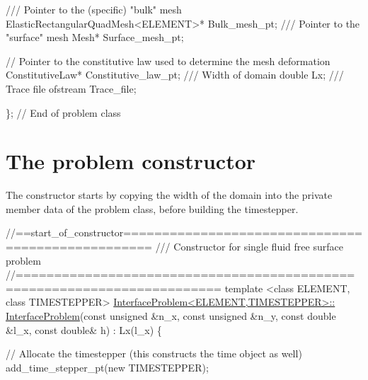 \begin{DoxyCodeInclude}
 \textcolor{comment}{/// Pointer to the (specific) "bulk" mesh}
 ElasticRectangularQuadMesh<ELEMENT>* Bulk\_mesh\_pt;
\textcolor{comment}{}
\textcolor{comment}{ /// Pointer to the "surface" mesh}
\textcolor{comment}{} Mesh* Surface\_mesh\_pt;

 \textcolor{comment}{// Pointer to the constitutive law used to determine the mesh deformation}
 ConstitutiveLaw* Constitutive\_law\_pt;
\textcolor{comment}{}
\textcolor{comment}{ /// Width of domain}
\textcolor{comment}{} \textcolor{keywordtype}{double} Lx;
\textcolor{comment}{}
\textcolor{comment}{ /// Trace file}
\textcolor{comment}{} ofstream Trace\_file;

\}; \textcolor{comment}{// End of problem class}

\end{DoxyCodeInclude}




 

\hypertarget{index_constructor}{}\section{The problem constructor}\label{index_constructor}
The constructor starts by copying the width of the domain into the private member data of the problem class, before building the timestepper.


\begin{DoxyCodeInclude}
\textcolor{comment}{//==start\_of\_constructor==================================================}
\textcolor{comment}{/// Constructor for single fluid free surface problem}
\textcolor{comment}{}\textcolor{comment}{//========================================================================}
\textcolor{keyword}{template} <\textcolor{keyword}{class} ELEMENT, \textcolor{keyword}{class} TIMESTEPPER>
\hyperlink{classInterfaceProblem_a83023535d663a2a6558959f36bf6e1e7}{InterfaceProblem<ELEMENT,TIMESTEPPER>::}
\hyperlink{classInterfaceProblem_a83023535d663a2a6558959f36bf6e1e7}{InterfaceProblem}(\textcolor{keyword}{const} \textcolor{keywordtype}{unsigned} &n\_x, \textcolor{keyword}{const} \textcolor{keywordtype}{unsigned} &n\_y,
                 \textcolor{keyword}{const} \textcolor{keywordtype}{double} &l\_x, \textcolor{keyword}{const} \textcolor{keywordtype}{double}& h) : Lx(l\_x)
\{

 \textcolor{comment}{// Allocate the timestepper (this constructs the time object as well)}
 add\_time\_stepper\_pt(\textcolor{keyword}{new} TIMESTEPPER);

\end{DoxyCodeInclude}


